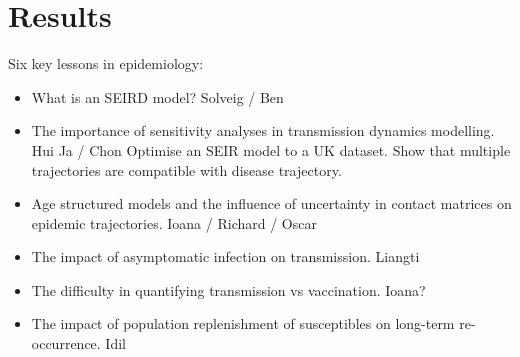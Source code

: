 \documentclass[]{article}
\begin{document}
\section{Results}
Six key lessons in epidemiology:
\begin{itemize}
	\item What is an SEIRD model? Solveig / Ben
	\item The importance of sensitivity analyses in transmission dynamics modelling. Hui Ja / Chon
	\subitem Optimise an SEIR model to a UK dataset. Show that multiple trajectories are compatible with disease trajectory.
	\item Age structured models and the influence of uncertainty in contact matrices on epidemic trajectories. Ioana / Richard / Oscar
	\item The impact of asymptomatic infection on transmission. Liangti
	\item The difficulty in quantifying transmission vs vaccination. Ioana?
	\item The impact of population replenishment of susceptibles on long-term re-occurrence. Idil
\end{itemize}
	




\end{document}
